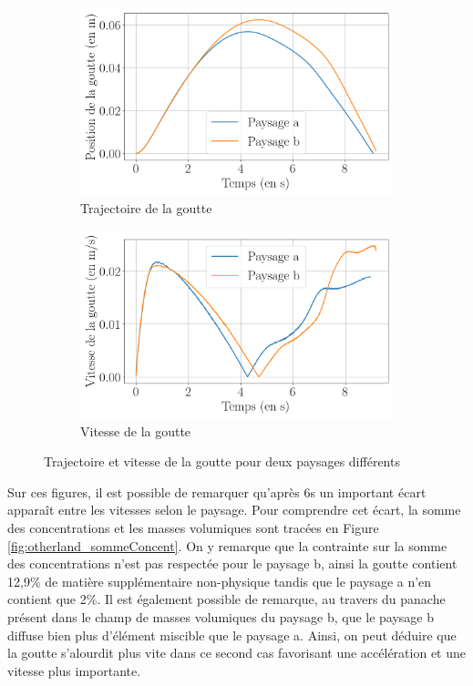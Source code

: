 \begin{figure}[H] 
	\centering
	\begin{subfigure}[H]{0.47\textwidth}
		\centering
		\includegraphics[width=\textwidth]{figure/influence_Landscape_position.png}
		\caption{Trajectoire de la goutte}
	\end{subfigure} 
	\begin{subfigure}[H]{0.47\textwidth}
		\centering
		\includegraphics[width=\textwidth]{figure/influence_Landscape_vitesse.png}
		\caption{Vitesse de la goutte}
	\end{subfigure}
	\caption{Trajectoire et vitesse de la goutte pour deux paysages différents}
	\label{fig:impactpaysage}
\end{figure}
Sur ces figures, il est possible de remarquer qu'après 6s un important écart apparaît entre les vitesses selon le paysage. Pour comprendre cet écart, la somme des concentrations et les masses volumiques sont tracées en Figure \ref{fig:otherland_sommeConcent}. On y remarque que la contrainte sur la somme des concentrations n'est pas respectée pour le paysage b, ainsi la goutte contient 12,9\% de matière supplémentaire non-physique tandis que le paysage a n'en contient que 2\%. Il est également possible de remarque, au travers du panache présent dans le champ de masses volumiques du paysage b, que le paysage b diffuse bien plus d'élément miscible que le paysage a. Ainsi, on peut déduire que la goutte s'alourdit plus vite dans ce second cas favorisant une accélération et une vitesse plus importante.
